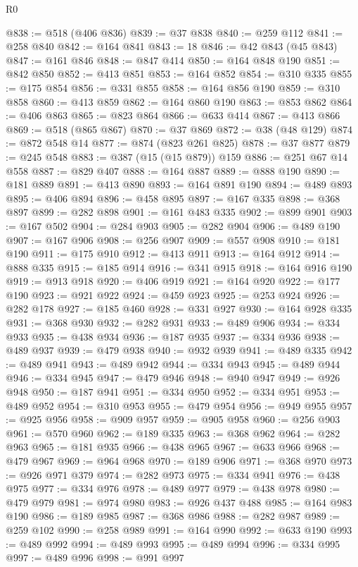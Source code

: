 \begin{lexlean}{R0}
\begin{coremodule}
@838 := @518 (@406 @836)
@839 := @37 @838
@840 := @259 @112
@841 := @258 @840
@842 := @164 @841
@843 := 18
@846 := @42 @843 (@45 @843)
@847 := @161 @846
@848 := @847 @414
@850 := @164 @848 @190
@851 := @842 @850
@852 := @413 @851
@853 := @164 @852
@854 := @310 @335
@855 := @175 @854
@856 := @331 @855
@858 := @164 @856 @190
@859 := @310 @858
@860 := @413 @859
@862 := @164 @860 @190
@863 := @853 @862
@864 := @406 @863
@865 := @823 @864
@866 := @633 @414
@867 := @413 @866
@869 := @518 (@865 @867)
@870 := @37 @869
@872 := @38 (@48 @129)
@874 := @872 @548 @14
@877 := @874 (@823 @261 @825)
@878 := @37 @877
@879 := @245 @548
@883 := @387 (@15 (@15 @879)) @159
@886 := @251 @67 @14 @558
@887 := @829 @407
@888 := @164 @887
@889 := @888 @190
@890 := @181 @889
@891 := @413 @890
@893 := @164 @891 @190
@894 := @489 @893
@895 := @406 @894
@896 := @458 @895
@897 := @167 @335
@898 := @368 @897
@899 := @282 @898
@901 := @161 @483 @335
@902 := @899 @901
@903 := @167 @502
@904 := @284 @903
@905 := @282 @904
@906 := @489 @190
@907 := @167 @906
@908 := @256 @907
@909 := @557 @908
@910 := @181 @190
@911 := @175 @910
@912 := @413 @911
@913 := @164 @912
@914 := @888 @335
@915 := @185 @914
@916 := @341 @915
@918 := @164 @916 @190
@919 := @913 @918
@920 := @406 @919
@921 := @164 @920
@922 := @177 @190
@923 := @921 @922
@924 := @459 @923
@925 := @253 @924
@926 := @282 @178
@927 := @185 @460
@928 := @331 @927
@930 := @164 @928 @335
@931 := @368 @930
@932 := @282 @931
@933 := @489 @906
@934 := @334 @933
@935 := @438 @934
@936 := @187 @935
@937 := @334 @936
@938 := @489 @937
@939 := @479 @938
@940 := @932 @939
@941 := @489 @335
@942 := @489 @941
@943 := @489 @942
@944 := @334 @943
@945 := @489 @944
@946 := @334 @945
@947 := @479 @946
@948 := @940 @947
@949 := @926 @948
@950 := @187 @941
@951 := @334 @950
@952 := @334 @951
@953 := @489 @952
@954 := @310 @953
@955 := @479 @954
@956 := @949 @955
@957 := @925 @956
@958 := @909 @957
@959 := @905 @958
@960 := @256 @903
@961 := @570 @960
@962 := @189 @335
@963 := @368 @962
@964 := @282 @963
@965 := @181 @935
@966 := @438 @965
@967 := @633 @966
@968 := @479 @967
@969 := @964 @968
@970 := @189 @906
@971 := @368 @970
@973 := @926 @971 @379
@974 := @282 @973
@975 := @334 @941
@976 := @438 @975
@977 := @334 @976
@978 := @489 @977
@979 := @438 @978
@980 := @479 @979
@981 := @974 @980
@983 := @926 @437 @488
@985 := @164 @983 @190
@986 := @189 @985
@987 := @368 @986
@988 := @282 @987
@989 := @259 @102
@990 := @258 @989
@991 := @164 @990
@992 := @633 @190
@993 := @489 @992
@994 := @489 @993
@995 := @489 @994
@996 := @334 @995
@997 := @489 @996
@998 := @991 @997

\end{coremodule}
\end{lexlean}
